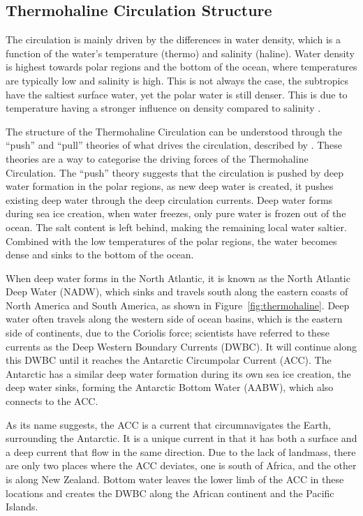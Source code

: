 \documentclass[12pt,a4paper]{article}
\begin{document}
\subsection{Thermohaline Circulation Structure}

The circulation is mainly driven by the differences in water density, which is 
a function of the water's temperature (thermo) and salinity (haline). Water
density is highest towards polar regions and the bottom of the ocean, where
temperatures are typically low and salinity is high. This is not always the
case, the subtropics have the saltiest surface water, yet the polar water is
still denser. This is due to temperature having a stronger influence on
density compared to salinity \citep{zika2015}.

The structure of the Thermohaline Circulation can be understood through the
``push'' and ``pull'' theories of what drives the circulation, described by
\citet{lozier2010}. These theories are a way to categorise the driving forces
of the Thermohaline Circulation. The ``push'' theory suggests that the
circulation is pushed by deep water formation in the polar regions, as new
deep water is created, it pushes existing deep water through the deep
circulation currents. Deep water forms during sea ice creation, when water
freezes, only pure water is frozen out of the ocean. The salt content is left
behind, making the remaining local water saltier. Combined with the low
temperatures of the polar regions, the water becomes dense and sinks to the
bottom of the ocean.

When deep water forms in the North Atlantic, it is known as the North Atlantic
Deep Water (NADW), which sinks and travels south along the eastern coasts of
North America and South America, as shown in Figure~\ref{fig:thermohaline}.
Deep water often travels along the western side of ocean basins, which is the
eastern side of continents, due to the Coriolis force; scientists have
referred to these currents as the Deep Western Boundary Currents (DWBC). It
will continue along this DWBC until it reaches the Antarctic Circumpolar
Current (ACC). The Antarctic has a similar deep water formation during its own
sea ice creation, the deep water sinks, forming the Antarctic Bottom Water
(AABW), which also connects to the ACC.

As its name suggests, the ACC is a current that circumnavigates the Earth,
surrounding the Antarctic. It is a unique current in that it has both a
surface and a deep current that flow in the same direction. Due to the lack of
landmass, there are only two places where the ACC deviates, one is south of
Africa, and the other is along New Zealand. Bottom water leaves the lower limb
of the ACC in these locations and creates the DWBC along the African continent
and the Pacific Islands.
\end{document}
